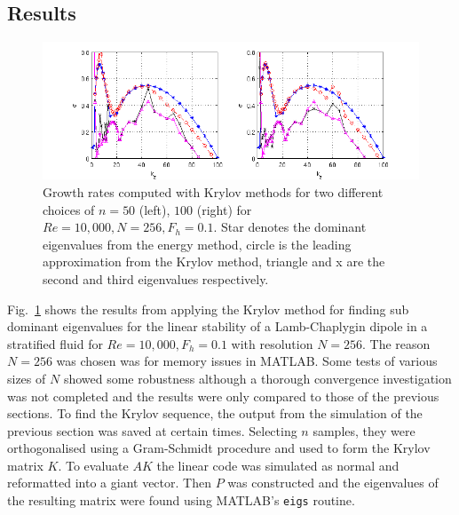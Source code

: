 \subsection{Results}
\begin{figure}
\begin{center}
\includegraphics[scale=0.7]{final_data.png}
\caption{Growth rates computed with Krylov methods for two different choices of $n=50$  (left), $100$ (right) for $Re=10{,}000, N=256, F_{h}=0.1$. Star denotes the dominant eigenvalues from the energy method, circle is the leading approximation from the Krylov method, triangle and x are the second and third eigenvalues respectively.}
\label{krylov_tests}
\end{center} 
\end{figure}
Fig.~\ref{krylov_tests} shows the results from applying the Krylov method for finding sub dominant eigenvalues for the linear stability of a Lamb-Chaplygin dipole in a stratified fluid for $Re=10{,}000, F_{h}=0.1$ with resolution $N=256$. The reason $N=256$ was chosen was for memory issues in MATLAB. Some tests of various sizes of $N$ showed some robustness although a thorough convergence investigation was not completed and the results were only compared to those of the previous sections. To find the Krylov sequence, the output from the simulation of the previous section was saved at certain times.  Selecting $n$ samples, they were orthogonalised using a Gram-Schmidt procedure  and used to form the Krylov matrix $K$. To evaluate $AK$ the linear code was simulated as normal and reformatted into a giant vector. Then $P$ was constructed and the eigenvalues of the resulting matrix were found using MATLAB's \texttt{eigs} routine. 

